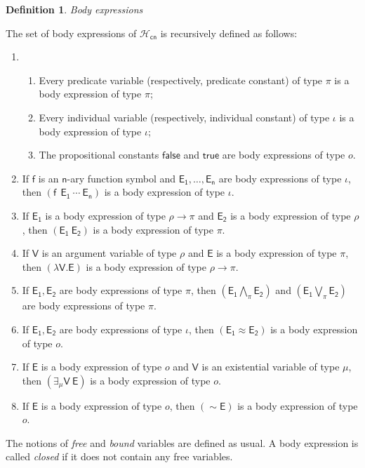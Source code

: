 \documentclass[inscr,ack,preface]{dithesis}
\theoremstyle{definition}
\newtheorem{definition}{Definition}[]
\newcommand{\hcn}{$\mathcal{H}_\mathsf{cn}$}
\newcommand{\msf}[1]{$\mathsf{#1}$}
\begin{document}
\begin{definition}{\emph{Body expressions}}

The set of body expressions of \hcn{} is recursively defined as follows:
\begin{enumerate}
  \item
  \begin{enumerate}
    \item Every predicate variable (respectively, predicate constant) of type $\pi$ is a body expression of type $\pi$;
    \item Every individual variable (respectively, individual constant) of type $\iota$ is a body expression of type $\iota$;
    \item The propositional constants \msf{false} and \msf{true} are body expressions of type $o$.
  \end{enumerate}
  \item If \msf{f} is an \msf{n}-ary function symbol and \msf{E_1, \ldots, E_n} are body expressions of type $\iota$, then \msf{\left( f ~~ E_1 ~ \cdots ~ E_n \right)} is a body expression of type $\iota$.
  \item If \msf{E_1} is a body expression of type $\rho \rightarrow \pi$ and \msf{E_2} is a body expression of type $\rho$, then \msf{\left( E_1 ~ E_2 \right)} is a body expression of type $\pi$.
  \item If \msf{V} is an argument variable of type $\rho$ and \msf{E} is a body expression of type $\pi$, then \msf{\left( \lambda V. E \right)} is a body expression of type $\rho \rightarrow \pi$.
  \item If \msf{E_1, E_2} are body expressions of type $\pi$, then \msf{\left( E_1 \bigwedge_{\pi} E_2 \right)} and \msf{\left( E_1 \bigvee_{\pi} E_2 \right)} are body expressions of type $\pi$.
  \item If \msf{E_1, E_2} are body expressions of type $\iota$, then \msf{\left( E_1 \approx E_2 \right)} is a body expression of type $o$.
  \item If \msf{E} is a body expression of type $o$ and \msf{V} is an existential variable of type $\mu$, then \msf{\left( \exists_{\mu} V ~ E \right)} is a body expression of type $o$.
  \item If \msf{E} is a body expression of type $o$, then \msf{\left( \sim E \right)} is a body expression of type $o$.
\end{enumerate}
\end{definition}

The notions of \emph{free} and \emph{bound} variables are defined as usual. A body expression is called \emph{closed} if it does not contain any free variables.
\end{document}
